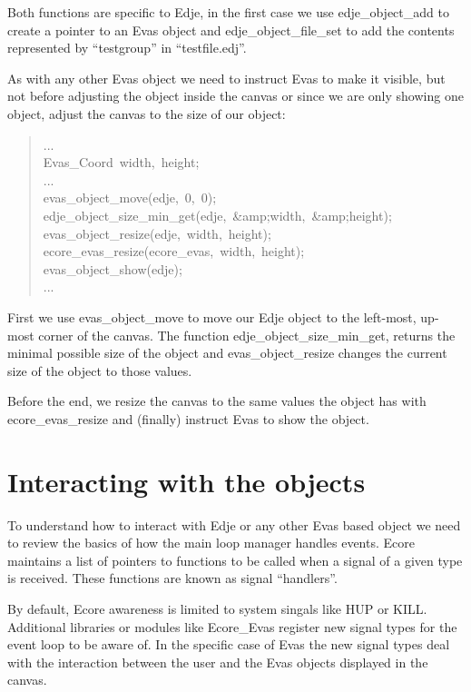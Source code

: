 \documentclass[12pt,a4paper,english]{book}
\begin{document}
Both functions are specific to Edje, in the first case we use edje{\_}object{\_}add
to create a pointer to an Evas object and edje{\_}object{\_}file{\_}set to add the
contents represented by ``testgroup'' in ``testfile.edj''.

As with any other Evas object we need to instruct Evas to make it visible, but
not before adjusting the object inside the canvas or since we are only showing
one object, adjust the canvas to the size of our object:
\begin{quote}{\ttfamily \raggedright \noindent
...~\\
Evas{\_}Coord~width,~height;~\\
...~\\
evas{\_}object{\_}move(edje,~0,~0);~\\
edje{\_}object{\_}size{\_}min{\_}get(edje,~{\&}amp;width,~{\&}amp;height);~\\
evas{\_}object{\_}resize(edje,~width,~height);~\\
ecore{\_}evas{\_}resize(ecore{\_}evas,~width,~height);~\\
evas{\_}object{\_}show(edje);~\\
...
}\end{quote}

First we use evas{\_}object{\_}move to move our Edje object to the left-most, up-most
corner of the canvas. The function edje{\_}object{\_}size{\_}min{\_}get, returns the
minimal possible size of the object and evas{\_}object{\_}resize changes the current
size of the object to those values.

Before the end, we resize the canvas to the same values the object has with
ecore{\_}evas{\_}resize and (finally) instruct Evas to show the object.



\hypertarget{interacting-with-the-objects}{}
\section{Interacting with the objects}
\label{interacting-with-the-objects}

To understand how to interact with Edje or any other Evas based object we need
to review the basics of how the main loop manager handles events. Ecore
maintains a list of pointers to functions to be called when a signal of a given
type is received. These functions are known as signal ``handlers''.

By default, Ecore awareness is limited to system singals like HUP or KILL.
Additional libraries or modules like Ecore{\_}Evas register new signal types for
the event loop to be aware of. In the specific case of Evas the new signal
types deal with the interaction between the user and the Evas objects displayed
in the canvas.
\end{document}
